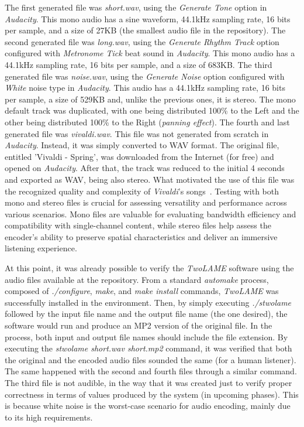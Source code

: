 The first generated file was \textit{short.wav}, using the \textit{Generate Tone} option in \textit{Audacity}. This mono audio has a sine waveform, 44.1kHz sampling rate, 16 bits per sample, and a size of 27KB (the smallest audio file in the repository). 
The second generated file was \textit{long.wav}, using the \textit{Generate Rhythm Track} option configured with \textit{Metronome Tick} beat sound in \textit{Audacity}. This mono audio has a 44.1kHz sampling rate, 16 bits per sample, and a size of 683KB. 
The third generated file was \textit{noise.wav}, using the \textit{Generate Noise} option configured with \textit{White} noise type in \textit{Audacity}. This audio has a 44.1kHz sampling rate, 16 bits per sample, a size of 529KB and, unlike the previous ones, it is stereo. The mono default track was duplicated, with one being distributed 100\% to the Left and the other being distributed 100\% to the Right (\textit{panning effect}). 
The fourth and last generated file was \textit{vivaldi.wav}. This file was not generated from scratch in \textit{Audacity}. Instead, it was simply converted to WAV format. The original file, entitled 'Vivaldi - Spring', was downloaded from the Internet (for free) and opened on \textit{Audacity}. After that, the track was reduced to the initial 4 seconds and exported as WAV, being also stereo. What motivated the use of this file was the recognized quality and complexity of \textit{Vivaldi}'s songs~\cite{vivaldi}.
Testing with both mono and stereo files is crucial for assessing versatility and performance across various scenarios. Mono files are valuable for evaluating bandwidth efficiency and compatibility with single-channel content, while stereo files help assess the encoder's ability to preserve spatial characteristics and deliver an immersive listening experience.

At this point, it was already possible to verify the \textit{TwoLAME} software using the audio files available at the repository. From a standard \textit{automake} process, composed of \textit{./configure}, \textit{make}, and \textit{make install} commands, \textit{TwoLAME} was successfully installed in the environment. Then, by simply executing \textit{./stwolame} followed by the input file name and the output file name (the one desired), the software would run and produce an MP2 version of the original file. 
In the process, both input and output file names should include the file extension. By executing the \textit{stwolame short.wav short.mp2} command, it was verified that both the original and the encoded audio files sounded the same (for a human listener). The same happened with the second and fourth files through a similar command. 
The third file is not audible, in the way that it was created just to verify proper correctness in terms of values produced by the system (in upcoming phases). This is because white noise is the worst-case scenario for audio encoding, mainly due to its high requirements. 


